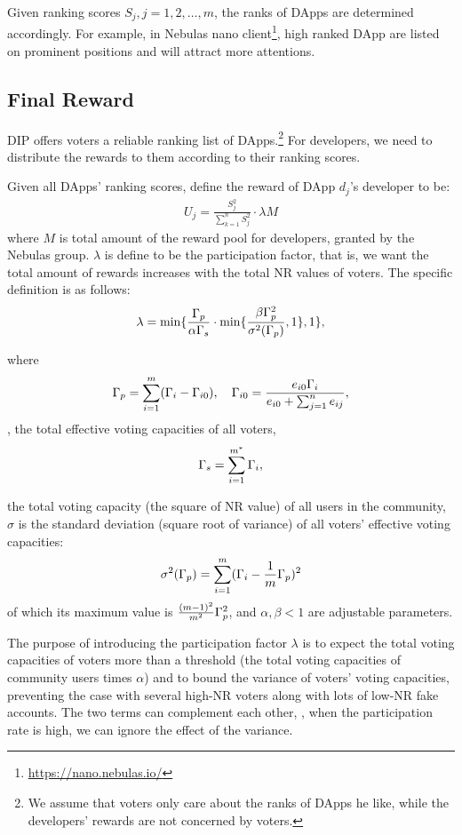 Given ranking scores $S_j,j=1,2,\ldots,m$, the ranks of DApps are determined accordingly. For example, in Nebulas nano client\footnote{\url{https://nano.nebulas.io/}}, high ranked DApp are listed on prominent positions and will attract more attentions.

\subsection{Final Reward}
\noindent DIP offers voters a reliable ranking list of DApps.\footnote{We assume that voters only care about the ranks of DApps he like, while the developers' rewards are not concerned by voters.} For developers, we need to distribute the rewards to them according to their ranking scores.

Given all DApps' ranking scores, define the reward of DApp $d_j$'s developer to be:
\begin{align}
	\label{eq:distribution}
	U_j = \frac{S_j^2}{\sum_{k=1}^n S_j^2}\cdot \lambda M
\end{align}
where $M$ is  total amount of the reward pool for developers, granted by the Nebulas group. $\lambda $ is define to be the participation factor, that is, we want the total amount of rewards increases with the total NR values of voters. The specific definition is as follows:
\begin{align}
	\lambda=\min\{\frac{\Gamma_p}{\alpha \Gamma_s }\cdot \min\{\frac{\beta\Gamma_p^2 }{\sigma^2(\Gamma_p)},1\},1\},
\end{align}

where $$\Gamma_p = \sum_{i=1}^m (\Gamma_i-\Gamma_{i0}),\quad \Gamma_{i0} = \frac{e_{i0}\Gamma_i}{e_{i0}+\sum_{j=1}^n {e_{ij}}},$$ \ie, the total effective voting capacities of all voters,
$$\Gamma_s = \sum_{i=1}^{m^*} \Gamma_i,$$

the total voting capacity (the square of NR value) of all users in the community, $\sigma$ is the standard deviation (square root of variance) of all voters' effective voting capacities:
$$ \sigma^2(\Gamma_p) = \sum_{i=1}^m (\Gamma_i-\frac{1}{m}\Gamma_p)^2 $$
of which its maximum value is $\frac{(m-1)^2}{m^2}\Gamma_p^2$, and $\alpha,\beta < 1$ are adjustable parameters.

The purpose of introducing the participation factor $\lambda$ is to expect the total voting capacities of voters more than a threshold (the total voting capacities of  community users times $\alpha$)  and to bound the variance of voters’ voting capacities, preventing the case with several high-NR voters along with lots of low-NR fake accounts. The two terms can complement each other, \ie, when the participation rate is high, we can ignore the effect of the variance.
